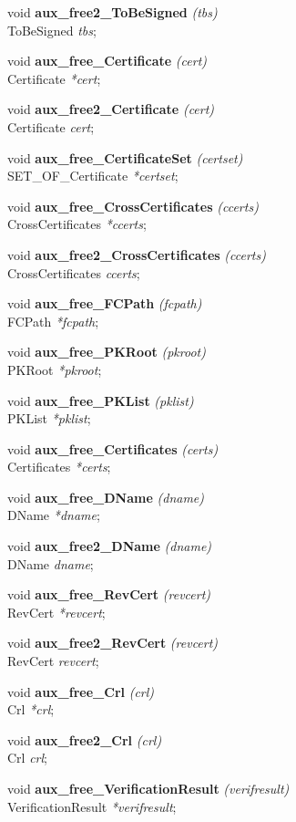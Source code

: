 void {\bf aux\_free2\_ToBeSigned} {\em (tbs)} \\
ToBeSigned {\em *tbs};

void {\bf aux\_free\_Certificate} {\em (cert)} \\
Certificate {\em **cert};

void {\bf aux\_free2\_Certificate} {\em (cert)} \\
Certificate {\em *cert};

void {\bf aux\_free\_CertificateSet} {\em (certset)} \\
SET\_OF\_Certificate {\em **certset};

void {\bf aux\_free\_CrossCertificates} {\em (ccerts)} \\
CrossCertificates {\em **ccerts};

void {\bf aux\_free2\_CrossCertificates} {\em (ccerts)} \\
CrossCertificates {\em *ccerts};

void {\bf aux\_free\_FCPath} {\em (fcpath)} \\
FCPath {\em **fcpath};

void {\bf aux\_free\_PKRoot} {\em (pkroot)} \\
PKRoot {\em **pkroot};

void {\bf aux\_free\_PKList} {\em (pklist)} \\
PKList {\em **pklist};

void {\bf aux\_free\_Certificates} {\em (certs)} \\
Certificates {\em **certs};

void {\bf aux\_free\_DName} {\em (dname)} \\
DName {\em **dname};

void {\bf aux\_free2\_DName} {\em (dname)} \\
DName {\em *dname};

void {\bf aux\_free\_RevCert} {\em (revcert)} \\
RevCert {\em **revcert};

void {\bf aux\_free2\_RevCert} {\em (revcert)} \\
RevCert {\em *revcert};

void {\bf aux\_free\_Crl} {\em (crl)} \\
Crl {\em **crl};

void {\bf aux\_free2\_Crl} {\em (crl)} \\
Crl {\em *crl};

void {\bf aux\_free\_VerificationResult} {\em (verifresult)} \\
VerificationResult {\em **verifresult};

